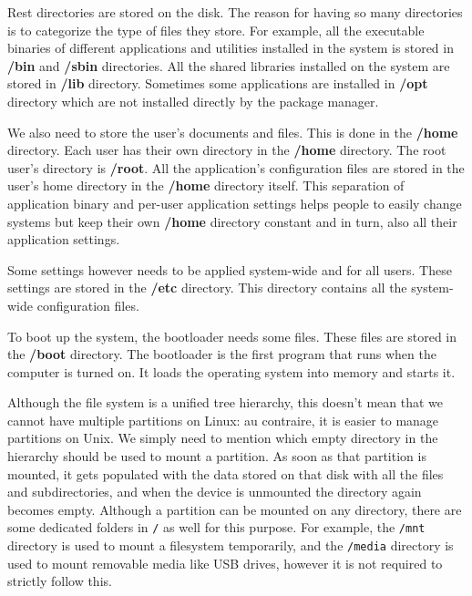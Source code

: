 Rest directories are stored on the disk.
The reason for having so many directories is to categorize the type of files they store.
For example, all the executable binaries of different applications and utilities installed in the system is stored in \textbf{/bin} and \textbf{/sbin} directories.
All the shared libraries installed on the system are stored in \textbf{/lib} directory.
Sometimes some applications are installed in \textbf{/opt} directory which are not installed directly by the package manager.

We also need to store the user's documents and files.
This is done in the \textbf{/home} directory.
Each user has their own directory in the \textbf{/home} directory.
The root user's directory is \textbf{/root}.
All the application's configuration files are stored in the user's home directory in the \textbf{/home} directory itself.
This separation of application binary and per-user application settings helps people to easily change systems but keep their own \textbf{/home} directory constant and in turn, also all their application settings.

Some settings however needs to be applied system-wide and for all users.
These settings are stored in the \textbf{/etc} directory.
This directory contains all the system-wide configuration files.

To boot up the system, the bootloader needs some files. These files are stored in the \textbf{/boot} directory.
The bootloader is the first program that runs when the computer is turned on. It loads the operating system into memory and starts it.

Although the file system is a unified tree hierarchy, this doesn't mean that we cannot have multiple partitions on Linux: au contraire, it is easier to manage partitions on Unix.
We simply need to mention which empty directory in the hierarchy should be used to mount a partition.
As soon as that partition is mounted, it gets populated with the data stored on that disk with all the files and subdirectories, and when the device is unmounted the directory again becomes empty.
Although a partition can be mounted on any directory, there are some dedicated folders in \lstinline|/| as well for this purpose.
For example, the \lstinline|/mnt| directory is used to mount a filesystem temporarily, and the \lstinline|/media| directory is used to mount removable media like USB drives, however it is not required to strictly follow this.

